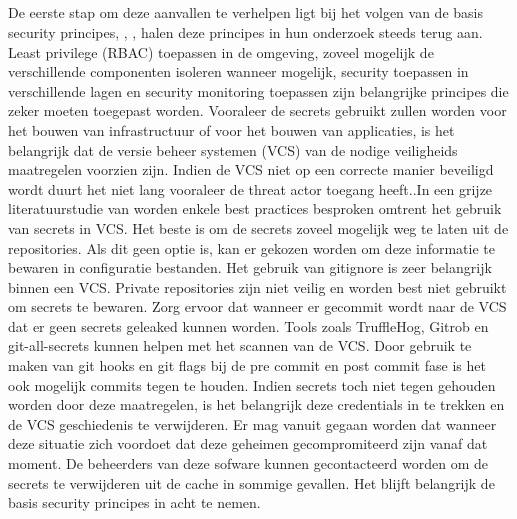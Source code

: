 \subsection{}%
\label{sec:Secrets in versie beheer en basis security principes}
De eerste stap om deze aanvallen te verhelpen ligt bij het volgen van de basis security principes, \autocite{Smart2022}, \autocite{Haymore2022}, \autocite{Suezawa2021} halen deze principes in hun onderzoek steeds terug aan. Least privilege (RBAC) toepassen in de omgeving, zoveel mogelijk de verschillende componenten isoleren wanneer mogelijk, security toepassen in verschillende lagen en security monitoring toepassen zijn belangrijke principes die zeker moeten toegepast worden. Vooraleer de secrets gebruikt zullen worden voor het bouwen van infrastructuur of voor het bouwen van applicaties, is het belangrijk dat de versie beheer systemen (VCS) van de nodige veiligheids maatregelen voorzien zijn. Indien de VCS niet op een correcte manier beveiligd wordt duurt het niet lang vooraleer de threat actor toegang heeft.\autocite{Mouw2021}.In een grijze literatuurstudie van \textcite{Basak2023} worden enkele best practices besproken omtrent het gebruik van secrets in VCS. Het beste is om de secrets zoveel mogelijk weg te laten uit de repositories. Als dit geen optie is, kan er gekozen worden om deze informatie te bewaren in configuratie bestanden. Het gebruik van gitignore is zeer belangrijk binnen een VCS. Private repositories zijn niet veilig en worden best niet gebruikt om secrets te bewaren. Zorg ervoor dat wanneer er gecommit wordt naar de VCS dat er geen secrets geleaked kunnen worden. Tools zoals TruffleHog, Gitrob en git-all-secrets kunnen helpen met het scannen van de VCS. Door gebruik te maken van git hooks en git flags bij de pre commit en post commit fase is het ook mogelijk commits tegen te houden. Indien secrets toch niet tegen gehouden worden door deze maatregelen, is het belangrijk deze credentials in te trekken en de VCS geschiedenis te verwijderen. Er mag vanuit gegaan worden dat wanneer deze situatie zich voordoet dat deze geheimen gecompromiteerd zijn vanaf dat moment. De beheerders van deze sofware kunnen gecontacteerd worden om de secrets te verwijderen uit de cache in sommige gevallen. Het blijft belangrijk de basis security principes in acht te nemen.

